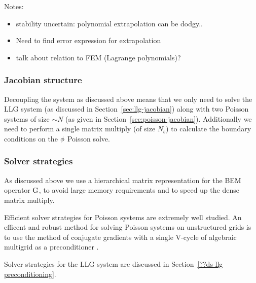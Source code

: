 Notes:
\begin{itemize}
\item stability uncertain: polynomial extrapolation can be dodgy..
\item Need to find error expression for extrapolation
\item talk about relation to FEM (Lagrange polynomials)?
\end{itemize}

\subsubsection{Jacobian structure}
\label{sec:bem-jacobian-structure}

Decoupling the system as discussed above means that we only need to solve the LLG system (as discussed in Section~\ref{sec:llg-jacobian}) along with two Poisson systems of size $\sim N$ (as given in Section~\ref{sec:poisson-jacobian}).
Additionally we need to perform a single matrix multiply (of size $N_b$) to calculate the boundary conditions on the $\phi$ Poisson solve.


\subsubsection{Solver strategies}
\label{sec:semi-implicit-bem-solver-strategies}

As discussed above we use a hierarchical matrix representation for the BEM operator ${\mathbf{\mathrm{G}}}$, to avoid large memory requirements and to speed up the dense matrix multiply.

Efficient solver strategies for Poisson systems are extremely well studied.
An efficent and robust method for solving Poisson systems on unstructured grids is to use the method of conjugate gradients with a single V-cycle of algebraic multigrid as a preconditioner \cite[Chap. 2]{HowardElmanDavidSilvester2006}.

Solver strategies for the LLG system are discussed in Section~\ref{??ds llg preconditioning}.


